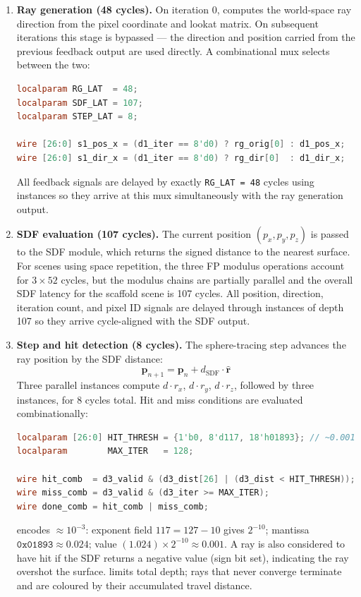 \begin{enumerate}
    \item \textbf{Ray generation (48 cycles).} On iteration 0, 
    computes the world-space ray direction from the pixel coordinate and lookat
    matrix. On subsequent iterations this stage is bypassed --- the direction and
    position carried from the previous feedback output are used directly. A
    combinational mux selects between the two:
\begin{lstlisting}[language=Verilog]
localparam RG_LAT  = 48;
localparam SDF_LAT = 107;
localparam STEP_LAT = 8;

wire [26:0] s1_pos_x = (d1_iter == 8'd0) ? rg_orig[0] : d1_pos_x;
wire [26:0] s1_dir_x = (d1_iter == 8'd0) ? rg_dir[0]  : d1_dir_x;
\end{lstlisting}
    All feedback signals are delayed by exactly \texttt{RG\_LAT = 48} cycles
    using  instances so they arrive at this mux simultaneously
    with the ray generation output.

    \item \textbf{SDF evaluation (107 cycles).} The current position
    $(p_x, p_y, p_z)$ is passed to the SDF module, which returns the signed
    distance to the nearest surface. For scenes using space repetition, the three
    FP modulus operations account for $3 \times 52$ cycles, but the modulus chains
    are partially parallel and the overall SDF latency for the scaffold scene is
    107 cycles. All position, direction, iteration count, and pixel ID signals
    are delayed through  instances of depth 107 so they arrive
    cycle-aligned with the SDF output.

    \item \textbf{Step and hit detection (8 cycles).} The sphere-tracing step
    advances the ray position by the SDF distance:
    \[
        \mathbf{p}_{n+1} = \mathbf{p}_n + d_{\text{SDF}} \cdot \hat{\mathbf{r}}
    \]
    Three parallel  instances compute $d \cdot r_x$, $d \cdot r_y$,
    $d \cdot r_z$, followed by three  instances, for 8 cycles total.
    Hit and miss conditions are evaluated combinationally:
\begin{lstlisting}[language=Verilog]
localparam [26:0] HIT_THRESH = {1'b0, 8'd117, 18'h01893}; // ~0.001
localparam        MAX_ITER   = 128;

wire hit_comb  = d3_valid & (d3_dist[26] | (d3_dist < HIT_THRESH));
wire miss_comb = d3_valid & (d3_iter >= MAX_ITER);
wire done_comb = hit_comb | miss_comb;
\end{lstlisting}

     encodes $\approx 10^{-3}$: exponent field $117 = 127 - 10$
    gives $2^{-10}$; mantissa $\texttt{0x01893} \approx 0.024$; value
    $(1.024) \times 2^{-10} \approx 0.001$. A ray is also considered to have hit
    if the SDF returns a negative value (sign bit set), indicating the ray
    overshot the surface.  limits total depth; rays that
    never converge terminate and are coloured by their accumulated travel distance.
\end{enumerate}

